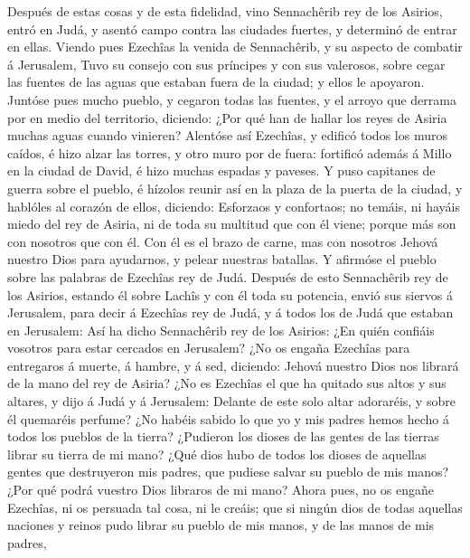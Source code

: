  Después de estas cosas y de esta fidelidad, vino
Sennachêrib rey de los Asirios, entró en Judá, y asentó campo contra las
ciudades fuertes, y determinó de entrar en ellas.  Viendo
pues Ezechîas la venida de Sennachêrib, y su aspecto de combatir á
Jerusalem,  Tuvo su consejo con sus príncipes y con sus
valerosos, sobre cegar las fuentes de las aguas que estaban fuera de la
ciudad; y ellos le apoyaron.  Juntóse pues mucho pueblo, y
cegaron todas las fuentes, y el arroyo que derrama por en medio del
territorio, diciendo: ¿Por qué han de hallar los reyes de Asiria muchas
aguas cuando vinieren?  Alentóse así Ezechîas, y edificó
todos los muros caídos, é hizo alzar las torres, y otro muro por de
fuera: fortificó además á Millo en la ciudad de David, é hizo muchas
espadas y paveses.  Y puso capitanes de guerra sobre el
pueblo, é hízolos reunir así en la plaza de la puerta de la ciudad, y
hablóles al corazón de ellos, diciendo:  Esforzaos y
confortaos; no temáis, ni hayáis miedo del rey de Asiria, ni de toda su
multitud que con él viene; porque más son con nosotros que con él.
 Con él es el brazo de carne, mas con nosotros Jehová
nuestro Dios para ayudarnos, y pelear nuestras batallas. Y afirmóse el
pueblo sobre las palabras de Ezechîas rey de Judá. 
Después de esto Sennachêrib rey de los Asirios, estando él sobre Lachîs
y con él toda su potencia, envió sus siervos á Jerusalem, para decir á
Ezechîas rey de Judá, y á todos los de Judá que estaban en Jerusalem:
 Así ha dicho Sennachêrib rey de los Asirios: ¿En quién
confiáis vosotros para estar cercados en Jerusalem?  ¿No
os engaña Ezechîas para entregaros á muerte, á hambre, y á sed,
diciendo: Jehová nuestro Dios nos librará de la mano del rey de Asiria?
 ¿No es Ezechîas el que ha quitado sus altos y sus
altares, y dijo á Judá y á Jerusalem: Delante de este solo altar
adoraréis, y sobre él quemaréis perfume?  ¿No habéis
sabido lo que yo y mis padres hemos hecho á todos los pueblos de la
tierra? ¿Pudieron los dioses de las gentes de las tierras librar su
tierra de mi mano?  ¿Qué dios hubo de todos los dioses de
aquellas gentes que destruyeron mis padres, que pudiese salvar su pueblo
de mis manos? ¿Por qué podrá vuestro Dios libraros de mi mano?
 Ahora pues, no os engañe Ezechîas, ni os persuada tal
cosa, ni le creáis; que si ningún dios de todas aquellas naciones y
reinos pudo librar su pueblo de mis manos, y de las manos de mis padres,
